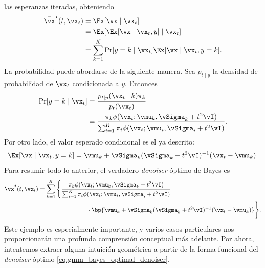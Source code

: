 \documentclass[../../book-main.tex]{subfiles}
\begin{document}
\begin{example}
    las esperanzas iteradas, obteniendo
    \begin{align}
        \bar{\vx}^{\star}(t, \vx_{t})
        &= \Ex[\vx \mid \vx_{t}] \\
        &= \Ex[\Ex[\vx \mid \vx_{t}, y] \mid \vx_{t}] \\
        &= \sum_{k = 1}^{K}\Pr[y = k \mid \vx_{t}]\Ex[\vx \mid \vx_{t}, y = k].
    \end{align}
    La probabilidad puede abordarse de la siguiente manera. Sea \(p_{t \mid
    y}\) la densidad de probabilidad de \(\vx_{t}\) condicionada a \(y\). Entonces
    \begin{align}
        \Pr[y = k \mid \vx_{t}]
        &= \frac{p_{t \mid y}(\vx_{t} \mid k)\pi_{k}}{p_{t}(\vx_{t})} \\
        &= \frac{\pi_{k}\phi(\vx_{t} ; \vmu_{k}, \vSigma_{k}
        + t^{2}\vI)}{\sum_{i = 1}^{K}\pi_{i}\phi(\vx_{t} ; \vmu_{i},
        \vSigma_{i} + t^{2}\vI)}.
    \end{align}
    Por otro lado, el valor esperado condicional es el ya descrito:
    \begin{equation}
        \Ex[\vx \mid \vx_{t}, y = k] = \vmu_{k} +
        \vSigma_{k}(\vSigma_{k} + t^{2}\vI)^{-1}(\vx_{t} - \vmu_{k}).
    \end{equation}
    Para resumir todo lo anterior, el verdadero \textit{denoiser} óptimo de Bayes es
    \begin{align}\label{eq:gmm_bayes_optimal_denoiser}
        \bar{\vx}^{\star}(t, \vx_{t}) &= \sum_{k =
        1}^{K}\Bigg\{\frac{\pi_{k}\phi(\vx_{t}
            ;\vmu_{k}, \vSigma_{k} + t^{2}\vI)}{\sum_{i =
                1}^{K}\pi_{i}\phi(\vx_{t}
            ;\vmu_{i}, \vSigma_{i} + t^{2}\vI)}\\
            &\qquad \qquad \qquad \qquad   \cdot \bp{\vmu_{k} +
        \vSigma_{k}(\vSigma_{k} + t^{2}\vI)^{-1}(\vx_{t} - \vmu_{k})}\Bigg\}.
    \end{align}
    Este ejemplo es especialmente importante, y varios casos particulares
    nos proporcionarán una profunda comprensión conceptual más adelante. Por ahora, intentemos
    extraer alguna intuición geométrica a partir de la forma funcional
    del \textit{denoiser} óptimo \eqref{eq:gmm_bayes_optimal_denoiser}.


\end{example}
\end{document}
